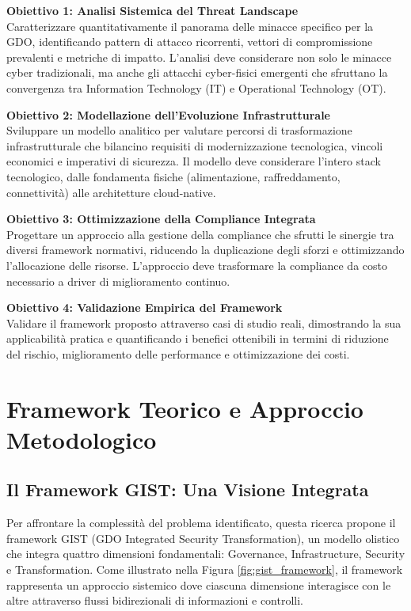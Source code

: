 \begin{bibunit}[IEEEtran]
\textbf{Obiettivo 1: Analisi Sistemica del Threat Landscape}\\
Caratterizzare quantitativamente il panorama delle minacce specifico per la GDO, identificando pattern di attacco ricorrenti, vettori di compromissione prevalenti e metriche di impatto. L'analisi deve considerare non solo le minacce cyber tradizionali, ma anche gli attacchi cyber-fisici emergenti che sfruttano la convergenza tra Information Technology (IT) e Operational Technology (OT).

\textbf{Obiettivo 2: Modellazione dell'Evoluzione Infrastrutturale}\\
Sviluppare un modello analitico per valutare percorsi di trasformazione infrastrutturale che bilancino requisiti di modernizzazione tecnologica, vincoli economici e imperativi di sicurezza. Il modello deve considerare l'intero stack tecnologico, dalle fondamenta fisiche (alimentazione, raffreddamento, connettività) alle architetture cloud-native.

\textbf{Obiettivo 3: Ottimizzazione della Compliance Integrata}\\
Progettare un approccio alla gestione della compliance che sfrutti le sinergie tra diversi framework normativi, riducendo la duplicazione degli sforzi e ottimizzando l'allocazione delle risorse. L'approccio deve trasformare la compliance da costo necessario a driver di miglioramento continuo.

\textbf{Obiettivo 4: Validazione Empirica del Framework}\\
Validare il framework proposto attraverso casi di studio reali, dimostrando la sua applicabilità pratica e quantificando i benefici ottenibili in termini di riduzione del rischio, miglioramento delle performance e ottimizzazione dei costi.

\section{Framework Teorico e Approccio Metodologico}

\subsection{Il Framework GIST: Una Visione Integrata}

Per affrontare la complessità del problema identificato, questa ricerca propone il framework GIST (GDO Integrated Security Transformation), un modello olistico che integra quattro dimensioni fondamentali: Governance, Infrastructure, Security e Transformation. Come illustrato nella Figura \ref{fig:gist_framework}, il framework rappresenta un approccio sistemico dove ciascuna dimensione interagisce con le altre attraverso flussi bidirezionali di informazioni e controlli.


\end{bibunit}
